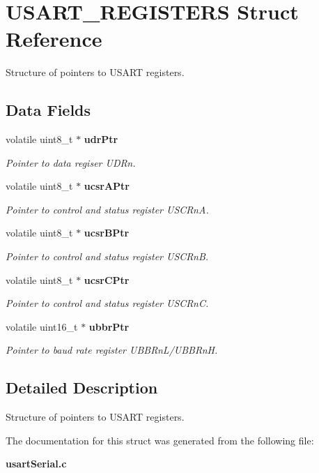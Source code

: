 \section{U\+S\+A\+R\+T\+\_\+\+R\+E\+G\+I\+S\+T\+E\+R\+S Struct Reference}
\label{struct_u_s_a_r_t___r_e_g_i_s_t_e_r_s}


Structure of pointers to U\+S\+A\+R\+T registers.  


\subsection*{Data Fields}
\begin{DoxyCompactItemize}
\item 
volatile uint8\+\_\+t $\ast$ {\bf udr\+Ptr}\label{struct_u_s_a_r_t___r_e_g_i_s_t_e_r_s_a5e90b4987509df93580223310ee175e7}

\begin{DoxyCompactList}\small\item\em Pointer to data regiser U\+D\+Rn. \end{DoxyCompactList}\item 
volatile uint8\+\_\+t $\ast$ {\bf ucsr\+A\+Ptr}\label{struct_u_s_a_r_t___r_e_g_i_s_t_e_r_s_a062b053bfdddcb231cd1b219d477becf}

\begin{DoxyCompactList}\small\item\em Pointer to control and status register U\+S\+C\+Rn\+A. \end{DoxyCompactList}\item 
volatile uint8\+\_\+t $\ast$ {\bf ucsr\+B\+Ptr}\label{struct_u_s_a_r_t___r_e_g_i_s_t_e_r_s_ac67a77143b9e96db567bd0da0fb04c41}

\begin{DoxyCompactList}\small\item\em Pointer to control and status register U\+S\+C\+Rn\+B. \end{DoxyCompactList}\item 
volatile uint8\+\_\+t $\ast$ {\bf ucsr\+C\+Ptr}\label{struct_u_s_a_r_t___r_e_g_i_s_t_e_r_s_ab5b5f88ddb38717710222f456d33f64a}

\begin{DoxyCompactList}\small\item\em Pointer to control and status register U\+S\+C\+Rn\+C. \end{DoxyCompactList}\item 
volatile uint16\+\_\+t $\ast$ {\bf ubbr\+Ptr}\label{struct_u_s_a_r_t___r_e_g_i_s_t_e_r_s_afe25499475da410fa8325bf7570c0c15}

\begin{DoxyCompactList}\small\item\em Pointer to baud rate register U\+B\+B\+Rn\+L/\+U\+B\+B\+Rn\+H. \end{DoxyCompactList}\end{DoxyCompactItemize}


\subsection{Detailed Description}
Structure of pointers to U\+S\+A\+R\+T registers. 

The documentation for this struct was generated from the following file\+:\begin{DoxyCompactItemize}
\item 
{\bf usart\+Serial.\+c}\end{DoxyCompactItemize}
